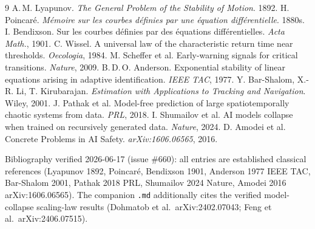 \documentclass[11pt]{article}
\theoremstyle{definition}
\begin{document}
\begin{thebibliography}{9}
 A.\,M. Lyapunov.
  \emph{The General Problem of the Stability of Motion}. 1892.
 H. Poincar\'e.
  \emph{M\'emoire sur les courbes d\'efinies par une \'equation diff\'erentielle}. 1880s.
 I. Bendixson.
  Sur les courbes d\'efinies par des \'equations diff\'erentielles. \emph{Acta Math.}, 1901.
 C. Wissel.
  A universal law of the characteristic return time near thresholds. \emph{Oecologia}, 1984.
 M. Scheffer et al.
  Early-warning signals for critical transitions. \emph{Nature}, 2009.
 B.\,D.\,O. Anderson.
  Exponential stability of linear equations arising in adaptive identification. \emph{IEEE TAC}, 1977.
 Y. Bar-Shalom, X.-R. Li, T. Kirubarajan.
  \emph{Estimation with Applications to Tracking and Navigation}. Wiley, 2001.
 J. Pathak et al.
  Model-free prediction of large spatiotemporally chaotic systems from data. \emph{PRL}, 2018.
 I. Shumailov et al.
  AI models collapse when trained on recursively generated data. \emph{Nature}, 2024.
 D. Amodei et al.
  Concrete Problems in AI Safety. \emph{arXiv:1606.06565}, 2016.
\end{thebibliography}

\begin{caveatbox}
Bibliography verified 2026-06-17 (issue \#660): all entries are established
classical references (Lyapunov 1892, Poincar\'e, Bendixson 1901, Anderson 1977
IEEE TAC, Bar-Shalom 2001, Pathak 2018 PRL, Shumailov 2024 Nature, Amodei 2016
arXiv:1606.06565). The companion \texttt{.md} additionally cites the verified
model-collapse scaling-law results (Dohmatob et al.\ arXiv:2402.07043; Feng et al.\
arXiv:2406.07515).
\end{caveatbox}
\end{document}

